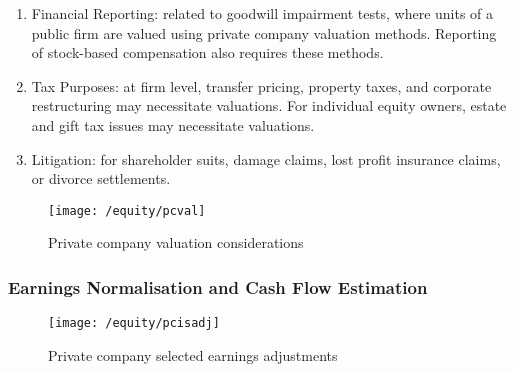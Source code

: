 \begin{remark} 
\begin{enumerate}[label=\roman*.]
\setlength{\itemsep}{0pt}
\item Financial Reporting: related to goodwill impairment tests, where units of a public firm are valued using private company valuation methods. Reporting of stock-based compensation also requires these methods.
\item Tax Purposes: at firm level, transfer pricing, property taxes, and corporate restructuring may necessitate valuations. For individual equity owners, estate and gift tax issues may necessitate valuations.
\item Litigation: for shareholder suits, damage claims, lost profit insurance claims, or divorce settlements.
\end{enumerate}
\end{remark}

\begin{figure}[H]
\centering
\texttt{[image: /equity/pcval]}
\caption{Private company valuation considerations}
\end{figure}

\subsubsection{Earnings Normalisation and Cash Flow Estimation}

\begin{figure}[H]
\centering
\texttt{[image: /equity/pcisadj]}
\caption{Private company selected earnings adjustments}
\end{figure}

